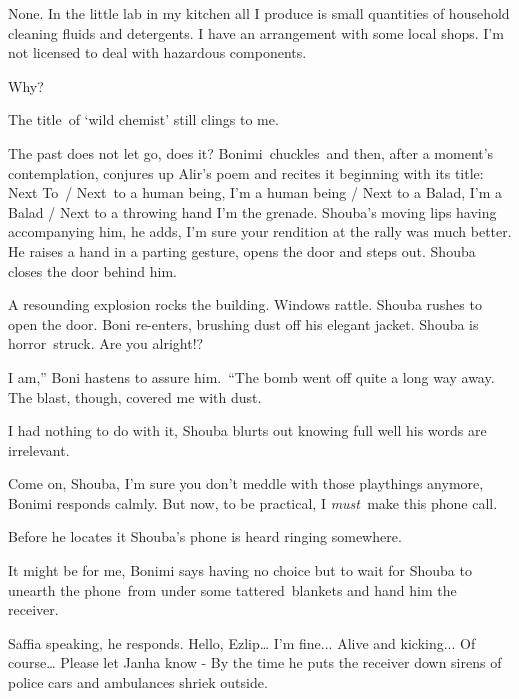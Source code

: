 \documentclass[letterpaper]{article}
\begin{document}
{\textquotedbl}None. In the little lab in my kitchen all I produce is small quantities of household cleaning fluids and
detergents. I have an arrangement with some local shops. I'm not licensed to deal with hazardous
components.{\textquotedbl} 

{\textquotedbl}Why?{\textquotedbl}

{\textquotedbl}The title~of {}`wild chemist' still clings to me.{\textquotedbl} 

{\textquotedbl}The past does not let go, does it?{\textquotedbl} Bonimi~chuckles\ and then, after a moment's
contemplation, conjures up Alir's poem and recites it beginning with its title: {\textquotedbl}Next To\ / Next~to a
human being, I'm a human being / Next to a Balad, I'm a Balad / Next to a throwing hand I'm the grenade.{\textquotedbl}
Shouba's moving lips having accompanying him, he adds, {\textquotedbl}I'm sure your rendition at the rally was much
better.{\textquotedbl} He raises a hand in a parting gesture, opens the door and steps out. Shouba closes the door
behind him.

A resounding explosion rocks the building. Windows rattle. Shouba rushes to open the door. Boni re-enters, brushing dust
off his elegant jacket. Shouba is horror\ struck. {\textquotedbl}Are you alright!?{\textquotedbl} 

{\textquotedbl}I am,'' Boni hastens to assure him.\ {}``The bomb went off quite a long way away. The blast, though,
covered me with dust.{\textquotedbl} 

{\textquotedbl}I had nothing to do with it,{\textquotedbl} Shouba blurts out knowing full well his words are irrelevant.

{\textquotedbl}Come on, Shouba, I'm sure you don't meddle with those playthings anymore,{\textquotedbl} Bonimi responds
calmly.  {\textquotedbl}But now, to be practical, I \textit{must\ }make this phone call.{\textquotedbl}

 Before he locates it Shouba's phone is heard ringing somewhere. 

{\textquotedbl}It might be for me,{\textquotedbl} Bonimi says having no choice but to wait for Shouba to unearth the
phone~from under some tattered\textcolor{red}{\ }blankets and hand him the receiver. 

{\textquotedbl}Saffia speaking,{\textquotedbl} he responds. {\textquotedbl}Hello, Ezlip{\dots} I'm fine... Alive and
kicking... Of course{\dots} Please let Janha know -{\textquotedbl} By the time he puts the receiver down sirens of
police cars and ambulances shriek outside. 
\end{document}
